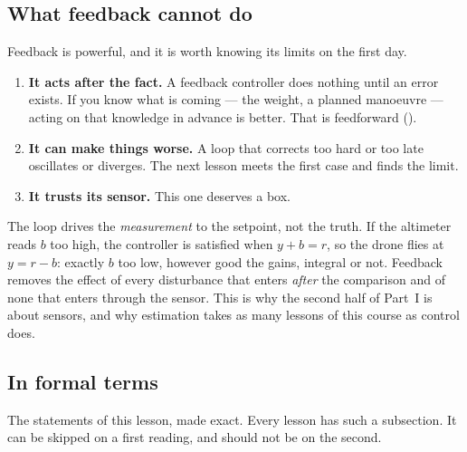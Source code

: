 \subsection{What feedback cannot do}
Feedback is powerful, and it is worth knowing its limits on the first day.

\begin{enumerate}
  \item \textbf{It acts after the fact.} A feedback controller does nothing until an error exists. If you know what is coming — the weight, a planned manoeuvre — acting on that knowledge in advance is better. That is feedforward ().
  \item \textbf{It can make things worse.} A loop that corrects too hard or too late oscillates or diverges. The next lesson meets the first case and  finds the limit.
  \item \textbf{It trusts its sensor.} This one deserves a box.
\end{enumerate}

\begin{watchout}
The loop drives the \emph{measurement} to the setpoint, not the truth. If the altimeter reads $b$ too high, the controller is satisfied when $y + b = r$, so the drone flies at $y = r - b$: exactly $b$ too low, however good the gains, integral or not. Feedback removes the effect of every disturbance that enters \emph{after} the comparison and of none that enters through the sensor. This is why the second half of Part~I is about sensors, and why estimation takes as many lessons of this course as control does.
\end{watchout}

\subsection{In formal terms}
The statements of this lesson, made exact. Every lesson has such a subsection. It can be skipped on a first reading, and should not be on the second.

